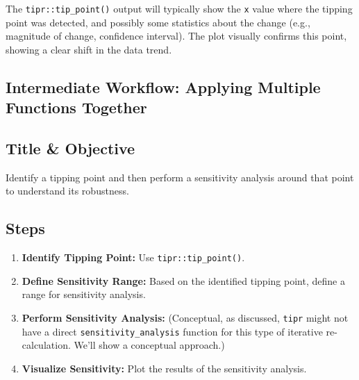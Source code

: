 \documentclass[
  10pt,
  letterpaper,
  DIV=11,
  numbers=noendperiod]{scrartcl}
\providecommand{\tightlist}{%
  \setlength{\itemsep}{0pt}\setlength{\parskip}{0pt}}
\begin{document}
The \texttt{tipr::tip\_point()} output will typically show the
\texttt{x} value where the tipping point was detected, and possibly some
statistics about the change (e.g., magnitude of change, confidence
interval). The plot visually confirms this point, showing a clear shift
in the data trend.

\subsection{Intermediate Workflow: Applying Multiple Functions
Together}\label{intermediate-workflow-applying-multiple-functions-together}

\subsection{Title \& Objective}\label{title-objective-1}

Identify a tipping point and then perform a sensitivity analysis around
that point to understand its robustness.

\subsection{Steps}\label{steps-1}

\begin{enumerate}
\def\labelenumi{\arabic{enumi}.}
\tightlist
\item
  \textbf{Identify Tipping Point:} Use \texttt{tipr::tip\_point()}.
\item
  \textbf{Define Sensitivity Range:} Based on the identified tipping
  point, define a range for sensitivity analysis.
\item
  \textbf{Perform Sensitivity Analysis:} (Conceptual, as discussed,
  \texttt{tipr} might not have a direct \texttt{sensitivity\_analysis}
  function for this type of iterative re-calculation. We'll show a
  conceptual approach.)
\item
  \textbf{Visualize Sensitivity:} Plot the results of the sensitivity
  analysis.
\end{enumerate}
\end{document}
